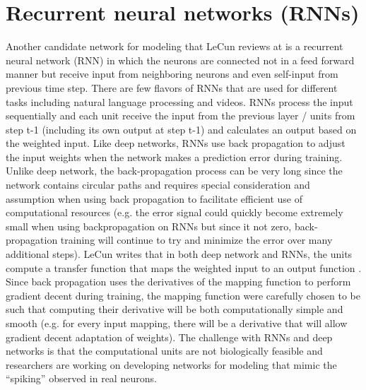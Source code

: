 \documentclass[draft,12pt,oneside]{CUNY_PhD}
\begin{document}
\section{Recurrent neural networks (RNNs)}
Another candidate network for modeling that LeCun reviews at \cite{13} is a recurrent neural network (RNN) in which the neurons are connected not in a feed forward manner but receive input from neighboring neurons and even self-input from previous time step. There are few flavors of RNNs that are used for different tasks including natural language processing and videos. RNNs process the input sequentially and each unit receive the input from the previous layer / units from step t-1 (including its own output at step t-1) and calculates an output based on the weighted input. Like deep networks, RNNs use back propagation to adjust the input weights when the network makes a prediction error during training. Unlike deep network, the back-propagation process can be very long since the network contains circular paths and requires special consideration and assumption when using back propagation to facilitate efficient use of computational resources (e.g. the error signal could quickly become extremely small when using backpropagation on RNNs but since it not zero, back-propagation training will continue to try and minimize the error over many additional steps). 
LeCun writes that in both deep network and RNNs, the units compute a transfer function that maps the weighted input to an output function \cite{13}. Since back propagation uses the derivatives of the mapping function to perform gradient decent during training, the mapping function were carefully chosen to be such that computing their derivative will be both computationally simple and smooth (e.g. for every input mapping, there will be a derivative that will allow gradient decent adaptation of weights). The challenge with RNNs and deep networks is that the computational units are not biologically feasible \cite{8} and researchers are working on developing networks for modeling that mimic the “spiking” observed in real neurons. 
\end{document}
